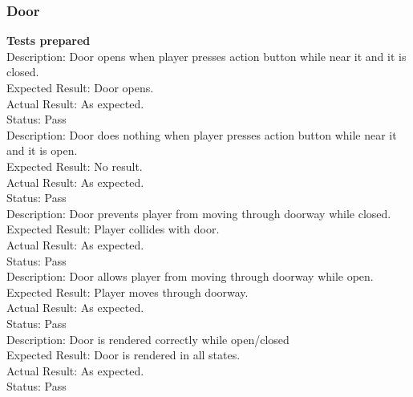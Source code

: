 \documentclass[11pt,a4paper]{article}
\begin{document}
\subsubsection{Door}
\textbf{Tests prepared}\\
Description: Door opens when player presses action button while near it and it is closed.\\
Expected Result: Door opens.\\
Actual Result: As expected.\\
Status: Pass
\smallskip\\
Description: Door does nothing when player presses action button while near it and it is open.\\
Expected Result: No result.\\
Actual Result: As expected.\\
Status: Pass
\smallskip\\
Description: Door prevents player from moving through doorway while closed.\\
Expected Result: Player collides with door.\\
Actual Result: As expected.\\
Status: Pass
\smallskip\\
Description: Door allows player from moving through doorway while open.\\
Expected Result: Player moves through doorway.\\
Actual Result: As expected.\\
Status: Pass
\smallskip\\
Description: Door is rendered correctly while open/closed\\
Expected Result: Door is rendered in all states.\\
Actual Result: As expected.\\
Status: Pass
\end{document}
